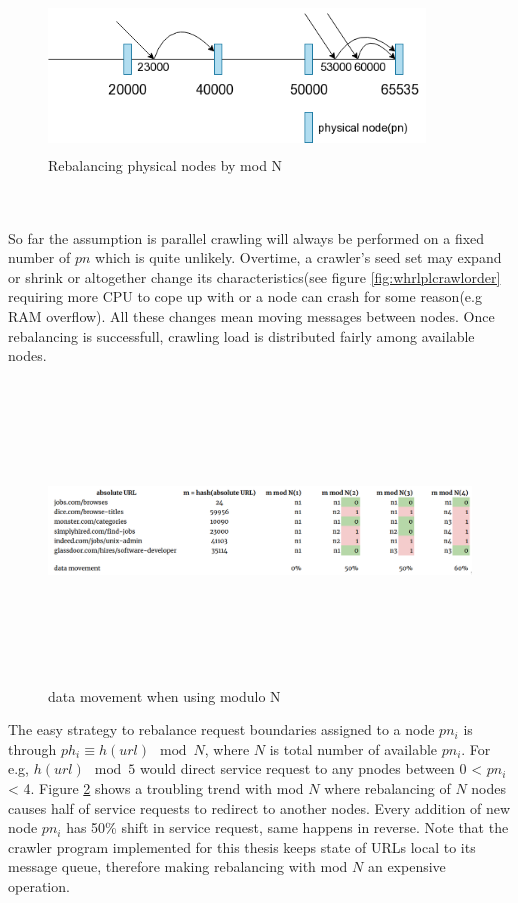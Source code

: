 \begin{figure}[h!]
  \centering
  \includegraphics[width=10cm,height=4cm,keepaspectratio]{../media/crawler/modnsplit.png}
  \caption{Rebalancing physical nodes by mod N}
  \label{fig:modnsplit}
\end{figure}
\\
\\
\noindent
So far the assumption is parallel crawling will always be performed on a fixed number of $pn$ which is quite
unlikely. Overtime, a crawler's seed set may expand or shrink or altogether change its characteristics(see
figure \ref{fig:whrlplcrawlorder} requiring more CPU to cope up with or a node can crash for some
reason(e.g RAM overflow). All these changes mean moving messages between nodes. Once rebalancing is successfull, crawling load is distributed fairly among available nodes.
\begin{figure}[h!]
  \centering
  \includegraphics[width=16cm,height=8cm,keepaspectratio]{../media/crawler/modn_info.png}
  \caption{data movement when using modulo N}
  \label{fig:movemodn}
\end{figure}

\noindent
The easy strategy to rebalance request boundaries assigned to a node $pn_i$ is through $ph_i \equiv h(url)\mod{N}$, where $N$ is total number of available $pn_i$. For e.g, $h(url)\mod 5$ would direct service request
to any pnodes between 0 < $pn_i$ < 4. Figure \ref{fig:movemodn} shows a troubling trend with mod $N$ where
rebalancing of $N$ nodes causes half of service requests to redirect to another nodes. Every addition of
new node $pn_i$ has 50\% shift in service request, same happens in reverse. Note that the crawler program implemented for this thesis keeps state of URLs local to its message queue, therefore making rebalancing
with mod $N$ an expensive operation.

